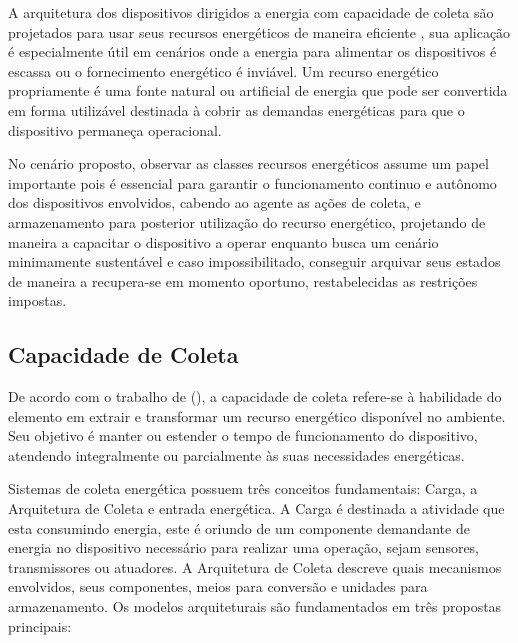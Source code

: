 A arquitetura dos dispositivos dirigidos a energia com capacidade de coleta são projetados para usar seus recursos energéticos de maneira eficiente  \cite{prauzek_energy_2018}, sua aplicação é especialmente útil em cenários onde a energia para alimentar os dispositivos é escassa ou o fornecimento energético é inviável. Um recurso energético propriamente é uma fonte natural ou artificial de energia que pode ser convertida em forma utilizável destinada à cobrir as demandas energéticas para que o dispositivo permaneça operacional.

No cenário proposto, observar as classes recursos energéticos assume um papel importante pois é essencial para garantir o funcionamento continuo e autônomo dos dispositivos envolvidos, cabendo ao agente as ações de coleta, e armazenamento para posterior utilização do recurso energético, projetando de maneira a capacitar o dispositivo a operar enquanto busca um cenário minimamente sustentável e caso impossibilitado, conseguir arquivar seus estados de maneira a recupera-se em momento oportuno, restabelecidas as restrições impostas.

\subsection{Capacidade de Coleta}
\label{Capacidade de Coleta}
De acordo com o trabalho de \citeauthor{sudevalayam_energy_2011}(\citeyear{sudevalayam_energy_2011}), a capacidade de coleta refere-se à habilidade do elemento em extrair e transformar um recurso energético disponível no ambiente. Seu objetivo é manter ou estender o tempo de funcionamento do dispositivo, atendendo integralmente ou parcialmente às suas necessidades energéticas.

Sistemas de coleta energética possuem três conceitos fundamentais: Carga, a Arquitetura de Coleta e entrada energética. A Carga é destinada a atividade que esta consumindo energia, este é oriundo de um componente demandante de energia no dispositivo necessário para realizar uma operação, sejam sensores, transmissores ou  atuadores. A Arquitetura de Coleta descreve quais mecanismos envolvidos, seus componentes, meios para conversão e unidades para armazenamento. Os modelos arquiteturais são fundamentados em três propostas principais:

